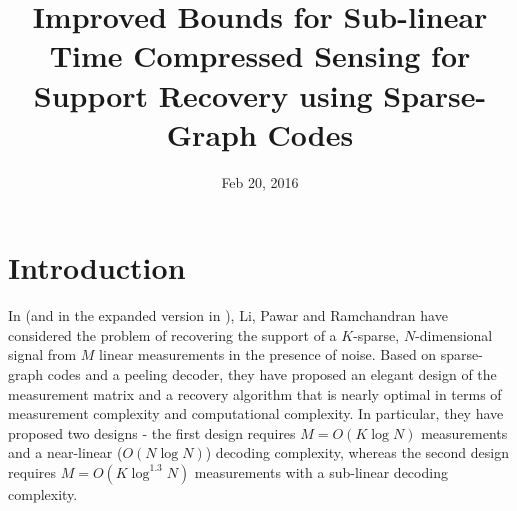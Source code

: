\documentclass[conference,onecolumn]{IEEEtran}
\begin{document}
\IEEEoverridecommandlockouts
\newtheorem{theorem}{Theorem}
\newtheorem{lemma}[theorem]{Lemma}
\newtheorem{remark}[theorem]{Remark}
\newtheorem{definition}[theorem]{Definition}
\newtheorem{corollary}[theorem]{Corollary}

\newcommand{\mbf}[1]{\mathbf{#1}}
\newcommand{\mc}[1]{\mathcal{#1}}
\newcommand{\Prob}{\text{Pr}}

\title{\LARGE{Improved Bounds for Sub-linear Time Compressed Sensing for Support Recovery using Sparse-Graph Codes}}
\author{
}
\date{Feb 20, 2016}
\maketitle

\pagestyle{empty}

\section{Introduction}
In \cite{li2015subisit} (and in the expanded version in \cite{li2015subdraft}), Li, Pawar and Ramchandran have considered the problem of recovering the support of a $K$-sparse, $N$-dimensional signal from $M$ linear measurements in the presence of noise. Based on sparse-graph codes and a peeling decoder, they have proposed an elegant design of the measurement matrix and a recovery algorithm that is nearly optimal in terms of measurement complexity and computational complexity. In particular, they have proposed two designs - the first design requires $M = O(K \log N)$ measurements and a near-linear ($O(N \log N)$) decoding complexity, whereas the second design requires $M = O(K \log^{1.3} N)$ measurements with a sub-linear decoding complexity.
\end{document}
